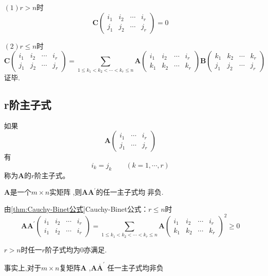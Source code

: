 \begin{green}
\begin{Proof}
$(1)r > n$时
\[
\bm{C}\begin{pmatrix}
        i_1&i_2&\cdots&i_r\\
        j_1&j_2&\cdots&j_r
    \end{pmatrix}=0
\]

$(2)r\leqslant n$时
\[
\bm{C}\begin{pmatrix}
        i_1&i_2&\cdots&i_r\\
        j_1&j_2&\cdots&j_r
    \end{pmatrix}=
    \sum_{1\leqslant k_1<k_2<\cdots<k_r\leqslant n}\bm{A}\begin{pmatrix}
        i_1&i_2&\cdots&i_r\\
        k_1&k_2&\cdots&k_r
    \end{pmatrix}\bm{B}\begin{pmatrix}
        k_1&k_2&\cdots&k_r\\
        j_1&j_2&\cdots&j_r
    \end{pmatrix}
\]
证毕.
\end{Proof}
\end{green}
\subsection{r阶主子式}
\begin{formal}
\begin{definition}[主子式]\label{def:主子式}
    如果
    \[
    \bm{A}\begin{pmatrix}
        i_1 & \cdots & i_r \\
        j_1 & \cdots & j_r 
    \end{pmatrix}
    \]
    有
    \[
    i_k = j_k \qquad
    \left(k = 1,\cdots ,r\right)
    \]
    称为$\bm{A}$的$r$阶主子式。
\end{definition}
\end{formal}
\begin{green}
\begin{corollary}[主子式非负]\label{cor:主子式非负}
    $\bm{A}$是一个$m \times n$实矩阵
    ,则$\bm{A}\bm{A}^{\prime}$的任一主子式均
    非负.
\end{corollary}
\begin{Proof}
由\cref{thm:Cauchy-Binet公式}Cauchy-Binet公式：$r \leqslant n$时
\[
\bm{AA}^{\prime}\begin{pmatrix}
    i_1&i_2&\cdots&i_r\\
    i_1&i_2&\cdots&i_r
\end{pmatrix}=
\sum_{1\leqslant k_1<k_2<\cdots<k_r\leqslant n}\bm{A}\begin{pmatrix}
    i_1&i_2&\cdots&i_r\\
    k_1&k_2&\cdots&k_r
\end{pmatrix}^2\geqslant 0
\]

$r > n$时任一$r$阶子式均为0亦满足.
\end{Proof}
\end{green}
\begin{green}
\begin{corollary}[复矩阵推广]\label{cor:复矩阵推广}
    事实上,对于$m \times n$复矩阵$\bm{A}$
    ,$\bm{A}\overline{\bm{A}}^{\prime} $
    任一主子式均非负
\end{corollary}
\end{green}
